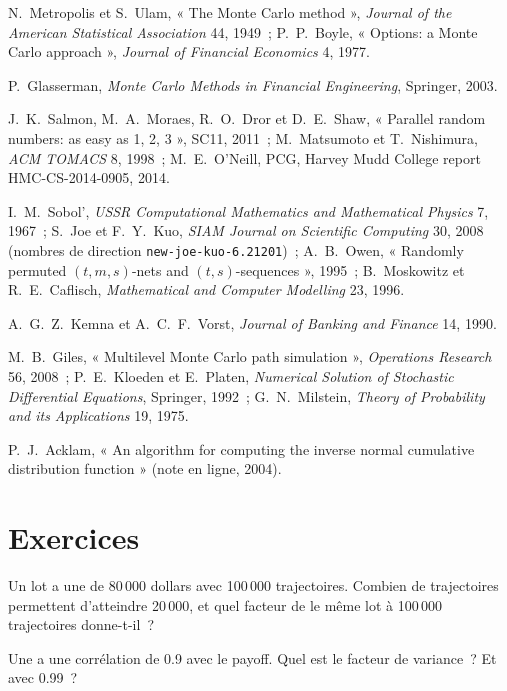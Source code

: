 \begin{omsources}
\item N.~Metropolis et S.~Ulam, « The Monte Carlo method », \emph{Journal of the American Statistical Association} 44, 1949~; P.~P.~Boyle, « Options: a Monte Carlo approach », \emph{Journal of
Financial Economics} 4, 1977.
\item P.~Glasserman, \emph{Monte Carlo Methods in Financial Engineering}, Springer, 2003.
\item J.~K.~Salmon, M.~A.~Moraes, R.~O.~Dror et D.~E.~Shaw, « Parallel random numbers: as easy as 1, 2, 3 », SC11, 2011~; M.~Matsumoto et T.~Nishimura, \emph{ACM TOMACS} 8, 1998~; M.~E.~O'Neill,
PCG, Harvey Mudd College report HMC-CS-2014-0905, 2014.
\item I.~M.~Sobol', \emph{USSR Computational Mathematics and Mathematical Physics} 7, 1967~; S.~Joe et F.~Y.~Kuo, \emph{SIAM Journal on Scientific Computing} 30, 2008 (nombres de direction
\texttt{new-joe-kuo-6.21201})~; A.~B.~Owen, « Randomly permuted $(t, m, s)$-nets and $(t, s)$-sequences », 1995~; B.~Moskowitz et R.~E.~Caflisch, \emph{Mathematical and Computer Modelling} 23, 1996.
\item A.~G.~Z.~Kemna et A.~C.~F.~Vorst, \emph{Journal of Banking and Finance} 14, 1990.
\item M.~B.~Giles, « Multilevel Monte Carlo path simulation », \emph{Operations Research} 56, 2008~; P.~E.~Kloeden et E.~Platen, \emph{Numerical Solution of Stochastic Differential Equations},
Springer, 1992~; G.~N.~Milstein, \emph{Theory of Probability and its Applications} 19, 1975.
\item P.~J.~Acklam, « An algorithm for computing the inverse normal cumulative distribution function » (note en ligne, 2004).
\end{omsources}

\section{Exercices}

\begin{exercise}[$\star$]\label{exo:qm:monte-carlo:1}
Un lot a une  de 80\,000 dollars avec 100\,000 trajectoires. Combien de trajectoires permettent d'atteindre 20\,000, et quel facteur de  le même lot à 100\,000 trajectoires donne-t-il~?
\end{exercise}

\begin{exercise}[$\star$]\label{exo:qm:monte-carlo:2}
Une  a une corrélation de 0.9 avec le payoff. Quel est le facteur de variance~? Et avec 0.99~?
\end{exercise}

